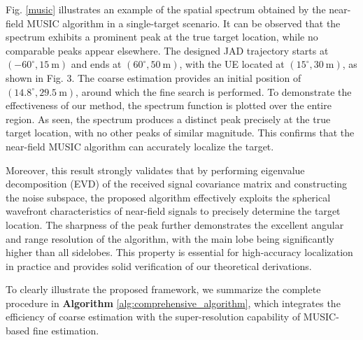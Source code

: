 \documentclass[lettersize,journal]{IEEEtran}
\begin{document}
Fig. \ref{music} illustrates an example of the spatial spectrum obtained by the near-field MUSIC algorithm in a single-target scenario. It can be observed that the spectrum exhibits a prominent peak at the true target location, while no comparable peaks appear elsewhere. The designed JAD trajectory starts at $(-60^\circ, 15\ \text{m})$ and ends at $(60^\circ, 50\ \text{m})$, with the UE located at $(15^\circ, 30\ \text{m})$, as shown in Fig. 3. The coarse estimation provides an initial position of $(14.8^\circ, 29.5\ \text{m})$, around which the fine search is performed. To demonstrate the effectiveness of our method, the spectrum function is plotted over the entire region. As seen, the spectrum produces a distinct peak precisely at the true target location, with no other peaks of similar magnitude. This confirms that the near-field MUSIC algorithm can accurately localize the target.

Moreover, this result strongly validates that by performing eigenvalue decomposition (EVD) of the received signal covariance matrix and constructing the noise subspace, the proposed algorithm effectively exploits the spherical wavefront characteristics of near-field signals to precisely determine the target location. The sharpness of the peak further demonstrates the excellent angular and range resolution of the algorithm, with the main lobe being significantly higher than all sidelobes. This property is essential for high-accuracy localization in practice and provides solid verification of our theoretical derivations.

To clearly illustrate the proposed framework, we summarize the complete procedure in \textbf{Algorithm} \ref{alg:comprehensive_algorithm}, which integrates the efficiency of coarse estimation with the super-resolution capability of MUSIC-based fine estimation.
\end{document}
